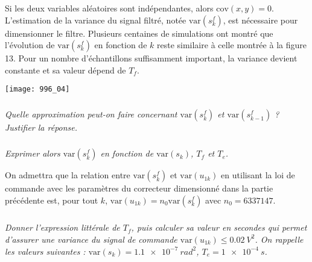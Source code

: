 Si les deux variables aléatoires sont indépendantes, alors $\text{cov}(x,y)=0$.
L’estimation de la variance du signal filtré, notée $\text{var}\left(s_k^f\right)$, est nécessaire pour dimensionner le filtre. Plusieurs centaines de simulations ont montré que l’évolution de $\text{var}\left(s_k^f\right)$ en fonction de $k$ reste similaire à celle montrée à
la figure 13. Pour un nombre d’échantillons suffisamment important, la variance devient constante et sa valeur
dépend de $T_f$.

\begin{center}
\centering
\texttt{[image: 996\_04]}
\end{center}

\subparagraph{}
\textit{Quelle approximation peut-on faire concernant $\text{var}\left(s_k^f\right)$ et $\text{var}\left(s_{k-1}^f\right)$ ? Justifier la réponse.}
\ifprof
\begin{corrige}
\end{corrige}
\else
\fi


\subparagraph{}
\textit{Exprimer alors $\text{var}\left(s_k^f\right)$ en fonction de  $\text{var}\left(s_{k}\right)$, $T_f$ et $T_e$.}
\ifprof
\begin{corrige}
\end{corrige}
\else
\fi


On admettra que la relation entre $\text{var}\left(s_k^f\right)$ et $\text{var}\left(u_{1k}\right)$
en utilisant la loi de commande avec les paramètres du correcteur dimensionné dans la partie précédente est, pour tout $k$, 
$\text{var}\left(u_{1k}\right)=n_0 \text{var}\left(s_{k}^f\right)$ avec $n_0=6337147$.


\subparagraph{}
\textit{Donner l’expression littérale de $T_f$, puis calculer sa valeur en secondes qui permet d’assurer une variance
du signal de commande $\text{var}\left(u_{1k}\right) \leq \SI{0,02}{V^2}$. On rappelle les valeurs suivantes : 
$\text{var}\left(s_{k}\right) =\SI{1,1e-7}{rad^2}$, $T_e = \SI{1e-4}{s}$.}
\ifprof
\begin{corrige}
\end{corrige}
\else
\fi





%
%
%
